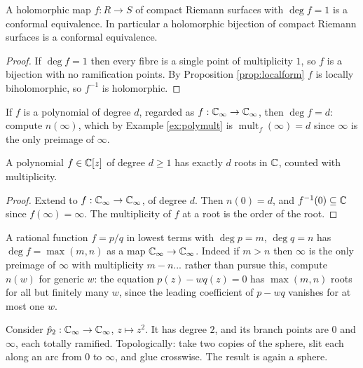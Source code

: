\documentclass[a4paper]{scrartcl}
\newcommand{\Cinf}{\C_\infty}
\newcommand{\mult}{\operatorname{mult}}
\begin{document}
\begin{corollary}\label{cor:degree1}
	A holomorphic map $f : R \to S$ of compact Riemann surfaces with $\deg f = 1$ is a
	conformal equivalence. In particular a holomorphic bijection of compact Riemann surfaces
	is a conformal equivalence.
\end{corollary}

\begin{proof}
	If $\deg f = 1$ then every fibre is a single point of multiplicity $1$, so $f$ is a
	bijection with no ramification points. By Proposition \ref{prop:localform} $f$ is
	locally biholomorphic, so $f^{-1}$ is holomorphic.
\end{proof}

\begin{example}
	If $f$ is a polynomial of degree $d$, regarded as $f : \Cinf\to\Cinf$, then $\deg f = d$:
	compute $n(\infty)$, which by Example \ref{ex:polymult} is $\mult_f(\infty) = d$ since
	$\infty$ is the only preimage of $\infty$.
\end{example}

\begin{corollary}
	A polynomial $f \in \mathbb{C}[z]$ of degree $d \geq 1$ has exactly $d$ roots in $\mathbb{C}$, counted
	with multiplicity.
\end{corollary}

\begin{proof}
	Extend to $f: \Cinf\to\Cinf$, of degree $d$. Then $n(0) = d$, and $f^{-1}(0) \subseteq \mathbb{C}$
	since $f(\infty)=\infty$. The multiplicity of $f$ at a root is the order of the root.
\end{proof}

\begin{example}
	A rational function $f = p/q$ in lowest terms with $\deg p = m$, $\deg q = n$ has
	$\deg f = \max(m,n)$ as a map $\Cinf\to\Cinf$. Indeed if $m > n$ then $\infty$ is the
	only preimage of $\infty$ with multiplicity $m - n$... rather than pursue this, compute
	$n(w)$ for generic $w$: the equation $p(z) - wq(z) = 0$ has $\max(m,n)$ roots for all
	but finitely many $w$, since the leading coefficient of $p - wq$ vanishes for at most
	one $w$.
\end{example}

\begin{example}\label{ex:2sheeted}
	Consider $\hat p_2 : \Cinf\to\Cinf$, $z\mapsto z^2$. It has degree $2$, and its
	branch points are $0$ and $\infty$, each totally ramified. Topologically: take two
	copies of the sphere, slit each along an arc from $0$ to $\infty$, and glue crosswise.
	The result is again a sphere.
\end{example}
\end{document}
